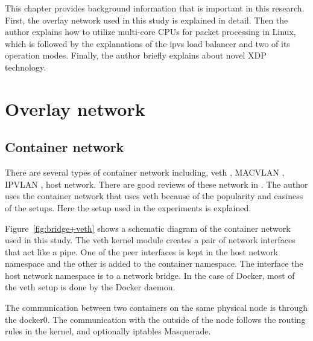 
This chapter provides background information that is important in this research.
First, the overlay network used in this study is explained in detail.
Then the author explains how to utilize multi-core CPUs for packet processing in Linux,
which is followed by the explanations of the ipvs load balancer and two of its operation modes.
Finally, the author briefly explains about novel XDP technology.

\section{Overlay network}

\subsection{Container network}

There are several types of container network including, veth \cite{bhattiprolu2008virtual}, MACVLAN \cite{rathore2010performance}, IPVLAN \cite{ipvlan}, host network.
There are good reviews of these network in  \cite{Marmol2015,claassen2016linux,struye2017assessing}.
The author uses the container network that uses veth because of the popularity and easiness of the setups.
Here the setup used in the experiments is explained.

Figure~\ref{fig:bridge+veth} shows a schematic diagram of the container network used in this study.
The veth kernel module creates a pair of network interfaces that act like a pipe.
One of the peer interfaces is kept in the host network namespace and the other is added to the container namespace.
The interface  the host network namespace is  to a network bridge.
In the case of Docker, most of the veth setup is done by the Docker daemon.

The communication between two containers on the same physical node is through the docker0.
The communication with the outside of the node follows the routing rules in the kernel, and optionally iptables Masquerade.  

